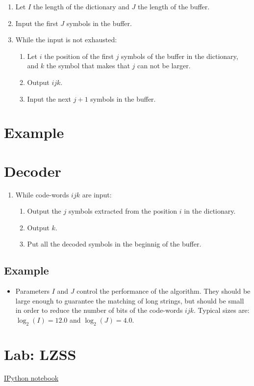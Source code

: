 \begin{enumerate}
\tightlist
\item
  Let \(I\) the length of the dictionary and \(J\) the length of the
  buffer.
\item
  Input the first \(J\) symbols in the buffer.
\item
  While the input is not exhausted:

  \begin{enumerate}
  \tightlist
  \item
    Let \(i\) the position of the first \(j\) symbols of the buffer in
    the dictionary, and \(k\) the symbol that makes that \(j\) can not
    be larger.
  \item
    Output \(ijk\).
  \item
    Input the next \(j+1\) symbols in the buffer.
  \end{enumerate}
\end{enumerate}

\section{Example}

\section{Decoder}

\begin{enumerate}
\tightlist
\item
  While code-words \(ijk\) are input:

  \begin{enumerate}
  \tightlist
  \item
    Output the \(j\) symbols extracted from the position \(i\) in the
    dictionary.
  \item
    Output \(k\).
  \item
    Put all the decoded symbols in the beginnig of the buffer.
  \end{enumerate}
\end{enumerate}

\subsection{Example}
\begin{itemize}
\tightlist
\item
  Parameters \(I\) and \(J\) control the performance of the algorithm.
  They should be large enough to guarantee the matching of long strings,
  but should be small in order to reduce the number of bits of the
  code-words \(ijk\). Typical sizes are: \(\log_2(I)=12.0\) and
  \(\log_2(J)=4.0\).
\end{itemize}

\section{Lab: LZSS}
\href{https://nbviewer.jupyter.org/github/vicente-gonzalez-ruiz/LZ77/blob/master/LZSS.ipynb}{IPython notebook}


